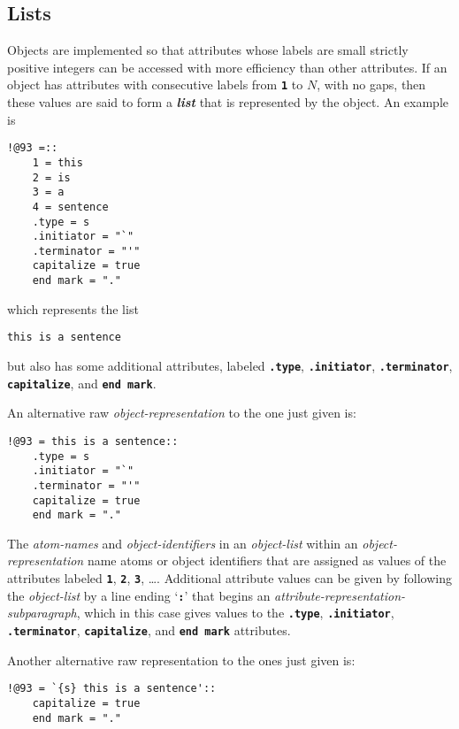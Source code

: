 \documentclass[12pt]{article}
\newcommand{\TT}[1]{{\tt \bfseries #1}}
\newcommand{\key}[1]{{\bf \em #1}\index{#1}}
\newenvironment{indpar}[1][0.3in]%
	{\begin{list}{}%
		     {\setlength{\itemsep}{0in}%
		      \setlength{\topsep}{0in}%
		      \setlength{\parsep}{1ex}%
		      \setlength{\labelwidth}{#1}%
		      \setlength{\leftmargin}{#1}%
		      \addtolength{\leftmargin}{\labelsep}}%
	 \item}%
	{\end{list}}
\begin{document}
\subsection{Lists}

Objects are implemented so that attributes whose labels are small
strictly positive integers can be accessed with more efficiency
than other attributes.  If an object has attributes with consecutive
labels from \TT{1} to $N$, with no gaps,
then these values are said to form a \key{list} that is represented
by the object.  An example is

\begin{indpar}\begin{verbatim}
!@93 =::
    1 = this
    2 = is
    3 = a
    4 = sentence
    .type = s
    .initiator = "`"
    .terminator = "'"
    capitalize = true
    end mark = "."
\end{verbatim}\end{indpar}

which represents the list
\begin{indpar}
\verb|this is a sentence|
\end{indpar}

but also has some additional attributes, labeled \TT{.type},
\TT{.initiator}, \TT{.terminator},
\TT{cap\-it\-al\-ize}, and \TT{end mark}.

An alternative raw {\em object-representation}
to the one just given is:

\begin{indpar}\begin{verbatim}
!@93 = this is a sentence::
    .type = s
    .initiator = "`"
    .terminator = "'"
    capitalize = true
    end mark = "."
\end{verbatim}\end{indpar}

The {\em atom-names} and {\em object-identifiers} in an {\em object-list}
within an {\em object-representation} name atoms or object identifiers that
are assigned as values of the attributes labeled \TT{1}, \TT{2},
\TT{3}, \ldots.  Additional attribute values can be given by
following the {\em object-list} by a line ending `\TT{:}' that begins an
{\em attribute-representation-subparagraph}, which in this case
gives values to the \TT{.type}, \TT{.initiator}, \TT{.terminator},
\TT{capitalize}, and \TT{end mark} attributes.

Another alternative raw representation to the ones just
given is:

\begin{indpar}\begin{verbatim}
!@93 = `{s} this is a sentence'::
    capitalize = true
    end mark = "."
\end{verbatim}\end{indpar}
\end{document}
